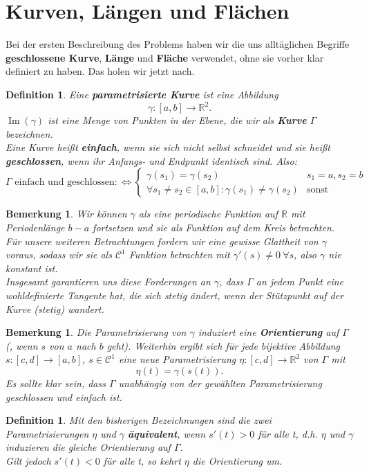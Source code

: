\documentclass[12pt,a4paper]{article}
\theoremstyle{plain}
\newtheorem{Definition}[Theorem]{Definition}
\newtheorem{Bemerkung}[Theorem]{Bemerkung}
\newcommand{\herv}[1]{{\emph{\textbf{#1}}}}
\newcommand{\R}{\mathbb{R}}
\numberwithin{equation}{section}
\begin{document}
\section{Kurven, Längen und Flächen}
Bei der ersten Beschreibung des Problems haben wir die uns alltäglichen Begriffe \textbf{geschlossene Kurve}, \textbf{Länge} und \textbf{Fläche} verwendet, ohne sie vorher klar definiert zu haben. Das holen wir jetzt nach.
\begin{Definition}
Eine \herv{parametrisierte Kurve} ist eine Abbildung \[ \gamma:[a,b] \rightarrow \R^2 .\]
$\operatorname{Im}(\gamma)$ ist eine Menge von Punkten in der Ebene, die wir als \herv{Kurve} $\Gamma$ bezeichnen.\\
Eine Kurve heißt \herv{einfach}, wenn sie sich nicht selbst schneidet und sie heißt \herv{geschlossen}, wenn ihr Anfangs- und Endpunkt identisch sind. Also:
\[ \Gamma \text{ einfach und geschlossen} :\Leftrightarrow \left\lbrace \begin{array}{ll}
\gamma(s_1)=\gamma(s_2)& s_1=a, s_2=b  \\ \forall s_1\neq s_2 \in [a,b]:  \gamma(s_1)\neq \gamma(s_2) & \text{sonst} \end{array}\right. \]
\end{Definition}
\begin{Bemerkung}
Wir können $\gamma$ als eine periodische Funktion auf $\R$ mit Periodenlänge $b-a$ fortsetzen und sie als Funktion auf dem Kreis betrachten.\\
Für unsere weiteren Betrachtungen fordern wir eine gewisse Glattheit von $\gamma$ voraus, sodass wir sie als $\mathcal{C}^1$ Funktion betrachten mit $\gamma'(s)\neq 0\ \forall s$, also $\gamma$ nie konstant ist. \\
Insgesamt garantieren uns diese Forderungen an $\gamma$, dass $\Gamma$ an jedem Punkt eine wohldefinierte Tangente hat, die sich stetig ändert, wenn der Stützpunkt auf der Kurve (stetig) wandert.
\end{Bemerkung}
\begin{Bemerkung}
Die Parametrisierung von $\gamma$ induziert eine \textbf{Orientierung} auf $\Gamma$(, wenn $s$ von $a$ nach $b$ geht). Weiterhin ergibt sich für jede bijektive Abbildung $s: [c,d] \rightarrow [a,b]$, $s\in \mathcal{C}^1$ eine neue Parametrisierung $\eta:[c,d] \rightarrow \R^2$ von $\Gamma$ mit \[ \eta(t) = \gamma(s(t)).\]
Es sollte klar sein, dass $\Gamma$ unabhängig von der gewählten Parametrisierung  geschlossen und einfach ist.
\end{Bemerkung}
\begin{Definition}
Mit den bisherigen Bezeichnungen sind die zwei Parametrisierungen $\eta$ und $\gamma$ \herv{äquivalent}, wenn $s'(t)>0$ für alle t, d.h. $\eta$ und $\gamma$ induzieren die gleiche Orientierung auf $\Gamma$.\\
Gilt jedoch $s'(t)<0$ für alle t, so kehrt $\eta$ die Orientierung um.
\end{Definition}
\end{document}
